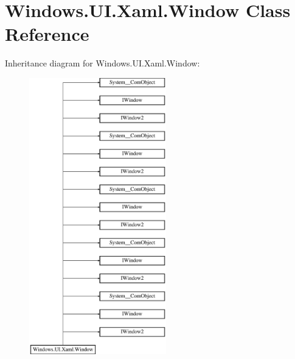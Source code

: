 \hypertarget{class_windows_1_1_u_i_1_1_xaml_1_1_window}{}\section{Windows.\+U\+I.\+Xaml.\+Window Class Reference}
\label{class_windows_1_1_u_i_1_1_xaml_1_1_window}
Inheritance diagram for Windows.\+U\+I.\+Xaml.\+Window\+:\begin{figure}[H]
\begin{center}
\leavevmode
\includegraphics[height=12.000000cm]{class_windows_1_1_u_i_1_1_xaml_1_1_window}
\end{center}
\end{figure}

